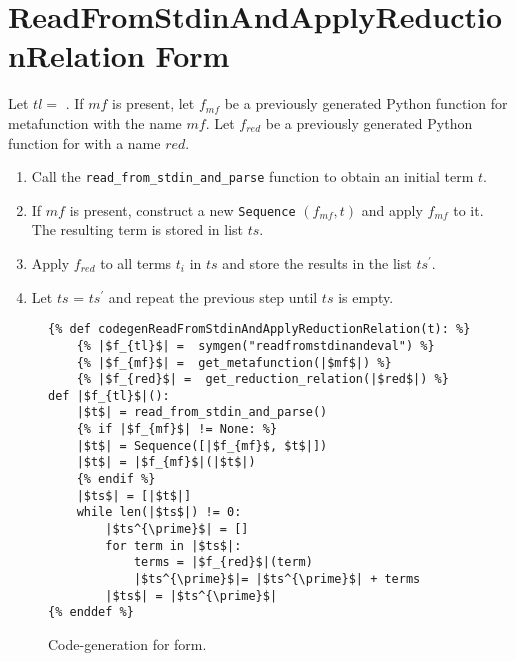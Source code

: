 \section{ReadFromStdinAndApplyReductionRelation Form}

Let $tl=$ \space\ReadFromStdinAndApplyReductionRelation. If $mf$ is present, let $f_{mf}$ be a previously generated Python function for metafunction with the name $mf$. Let $f_{red}$ be a previously generated Python function for \DefineReductionRelationNoArgs \space with a name $red$. 

\begin{enumerate}
\item Call the \texttt{read\_from\_stdin\_and\_parse} function to obtain an initial term $t$.
\item If $mf$ is present, construct a new \texttt{Sequence} $(f_{mf}, t)$ and apply $f_{mf}$ to it. The resulting term is stored in list $ts$.
\item Apply $f_{red}$ to all terms $t_i$ in $ts$ and store the results in the list $ts^{\prime}$.
\item Let $ts$ = $ts^{\prime}$ and repeat the previous step until $ts$ is empty.
\end{enumerate}

\begin{figure}
\begin{verbatim}
{% def codegenReadFromStdinAndApplyReductionRelation(t): %}
	{% |$f_{tl}$| =  symgen("readfromstdinandeval") %}
	{% |$f_{mf}$| =  get_metafunction(|$mf$|) %}
	{% |$f_{red}$| =  get_reduction_relation(|$red$|) %}
def |$f_{tl}$|():
	|$t$| = read_from_stdin_and_parse()
	{% if |$f_{mf}$| != None: %}
	|$t$| = Sequence([|$f_{mf}$, $t$|])
	|$t$| = |$f_{mf}$|(|$t$|)
	{% endif %}
    |$ts$| = [|$t$|]
    while len(|$ts$|) != 0:
        |$ts^{\prime}$| = []
        for term in |$ts$|:
            terms = |$f_{red}$|(term)
            |$ts^{\prime}$|= |$ts^{\prime}$| + terms 
        |$ts$| = |$ts^{\prime}$|
{% enddef %}
\end{verbatim}
\caption{Code-generation for \ReadFromStdinAndApplyReductionRelationNoArgs \space form.}
\label{codegen-repl}
\end{figure}
